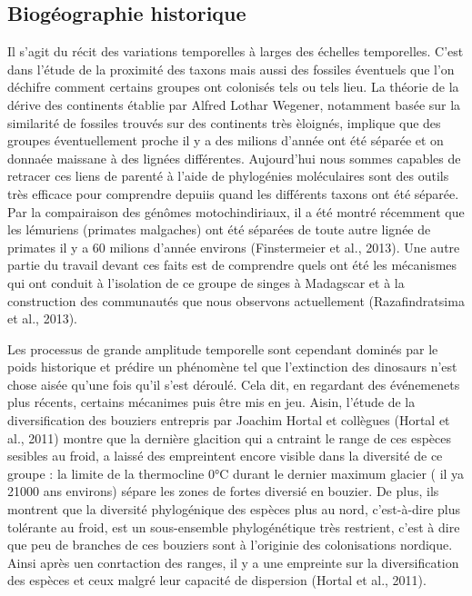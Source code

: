 \subsection*{Biogéographie
historique}\label{bioguxe9ographie-historique}

Il s'agit du récit des variations temporelles à larges des échelles
temporelles. C'est dans l'étude de la proximité des taxons mais aussi
des fossiles éventuels que l'on déchifre comment certains groupes ont
colonisés tels ou tels lieu. La théorie de la dérive des continents
établie par Alfred Lothar Wegener, notamment basée sur la similarité de
fossiles trouvés sur des continents très èloignés, implique que des
groupes éventuellement proche il y a des milions d'année ont été séparée
et on donnaée maissane à des lignées différentes. Aujourd'hui nous
sommes capables de retracer ces liens de parenté à l'aide de phylogénies
moléculaires sont des outils très efficace pour comprendre depuiis quand
les différents taxons ont été séparée. Par la compairaison des génômes
motochindiriaux, il a été montré récemment que les lémuriens (primates
malgaches) ont été séparées de toute autre lignée de primates il y a 60
milions d'année environs (Finstermeier et al., 2013). Une autre partie
du travail devant ces faits est de comprendre quels ont été les
mécanismes qui ont conduit à l'isolation de ce groupe de singes à
Madagscar et à la construction des communautés que nous observons
actuellement (Razafindratsima et al., 2013).

Les processus de grande amplitude temporelle sont cependant dominés par
le poids historique et prédire un phénomène tel que l'extinction des
dinosaurs n'est chose aisée qu'une fois qu'il s'est déroulé. Cela dit,
en regardant des événemenets plus récents, certains mécanimes puis être
mis en jeu. Aisin, l'étude de la diversification des bouziers entrepris
par Joachim Hortal et collègues (Hortal et al., 2011) montre que la
dernière glacition qui a cntraint le range de ces espèces sesibles au
froid, a laissé des empreintent encore visible dans la diversité de ce
groupe : la limite de la thermocline 0°C durant le dernier maximum
glacier ( il ya 21000 ans environs) sépare les zones de fortes diversié
en bouzier. De plus, ils montrent que la diversité phylogénique des
espèces plus au nord, c'est-à-dire plus tolérante au froid, est un
sous-ensemble phylogénétique très restrient, c'est à dire que peu de
branches de ces bouziers sont à l'originie des colonisations nordique.
Ainsi après uen conrtaction des ranges, il y a une empreinte sur la
diversification des espèces et ceux malgré leur capacité de dispersion
(Hortal et al., 2011).

